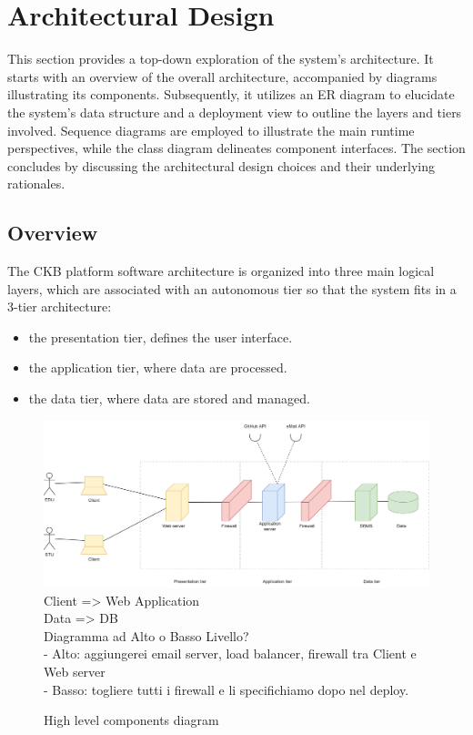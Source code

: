 \chapter{Architectural Design}
This section provides a top-down exploration of the system's architecture. 
It starts with an overview of the overall architecture, accompanied by diagrams illustrating its components. 
Subsequently, it utilizes an ER diagram to elucidate the system's data structure and a deployment view to outline the layers and tiers involved. 
Sequence diagrams are employed to illustrate the main runtime perspectives, while the class diagram delineates component interfaces. 
The section concludes by discussing the architectural design choices and their underlying rationales.

\section{Overview}
The CKB platform software architecture is organized into three main logical layers, which are associated with an autonomous tier so that the system fits in a 3-tier architecture:
\begin{itemize}
    \item the presentation tier, defines the user interface.
    \item the application tier, where data are processed.
    \item the data tier, where data are stored and managed.
\end{itemize}

\begin{figure}[H]
    \centering
    \includegraphics[width=\textwidth]{images/diagrams/high_level_diagram.png}
    {\color{red}
        Client => Web Application \\ 
        Data => DB \\   
        Diagramma ad Alto o Basso Livello? \\
         - Alto: aggiungerei email server, load balancer, firewall tra Client e Web server \\
         - Basso: togliere tutti i firewall e li specifichiamo dopo nel deploy.
    }
    \caption{High level components diagram}
\end{figure}

